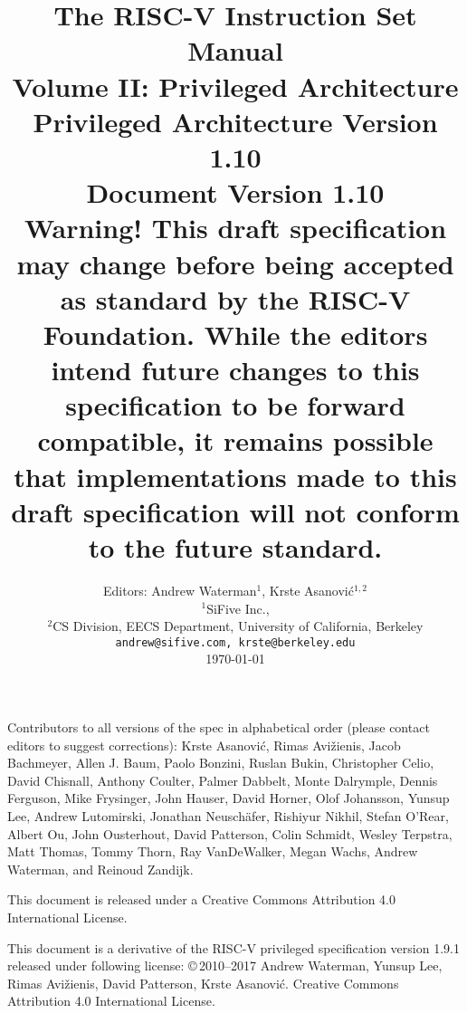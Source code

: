 \documentclass[twoside,11pt]{book}
\newcommand{\privrev}{1.10}
\begin{document}
\title{{\vspace{-0.7in}\Large {\bf The RISC-V Instruction Set Manual}} \\
  \large {\bf Volume II: Privileged Architecture} \\
  Privileged Architecture Version \privrev \\
  Document Version \privrev \\
    {\bf Warning! This draft specification
    may change before being accepted as standard by the RISC-V Foundation.
    While the editors intend future changes to this specification to be
    forward compatible, it remains possible that
    implementations made to this draft specification will not conform
    to the future standard.}
  \vspace{-0.1in}}

\author{Editors: Andrew Waterman$^{1}$, Krste Asanovi\'{c}$^{1,2}$ \\
  $^{1}$SiFive Inc., \\
  $^{2}$CS Division, EECS Department, University of California, Berkeley \\
  {\tt andrew@sifive.com, krste@berkeley.edu} \\
  \today
}

\date{} 
\maketitle

Contributors to all versions of the spec in alphabetical order (please
contact editors to suggest corrections): Krste Asanovi\'{c}, Rimas
Avi\v{z}ienis, Jacob Bachmeyer, Allen J. Baum, Paolo Bonzini, Ruslan
Bukin, Christopher Celio, David Chisnall, Anthony Coulter, Palmer
Dabbelt, Monte Dalrymple, Dennis Ferguson, Mike Frysinger, John
Hauser, David Horner, Olof Johansson, Yunsup Lee, Andrew Lutomirski,
Jonathan Neusch{\"a}fer, Rishiyur Nikhil, Stefan O'Rear, Albert Ou,
John Ousterhout, David Patterson, Colin Schmidt, Wesley Terpstra, Matt
Thomas, Tommy Thorn, Ray VanDeWalker, Megan Wachs, Andrew Waterman,
and Reinoud Zandijk.

This document is released under a Creative Commons Attribution 4.0
International License.

This document is a derivative of the RISC-V
privileged specification version 1.9.1 released under following license:
\copyright \,2010--2017 Andrew Waterman, Yunsup Lee, Rimas
Avi\v{z}ienis, David Patterson, Krste Asanovi\'{c}. 
Creative Commons Attribution 4.0 International License.
\end{document}
